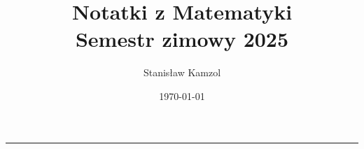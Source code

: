 

\title{\Huge\bfseries Notatki z Matematyki\\[1ex]\large\color{ctpLatteSubtext} Semestr zimowy 2025}
\author{\large Stanisław Kamzol}
\date{\today}


\color{ctpLatteText}

\maketitle
\hrule height 1.2pt
\vspace{1.5em}
\tableofcontents
\newpage




